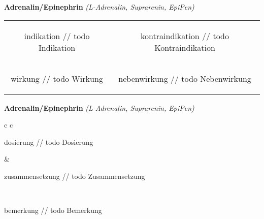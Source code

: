 \documentclass[12pt]{beamer}
\begin{document}
\begin{frame}{
    \textbf{Adrenalin/Epinephrin}
    \textit{(L-Adrenalin, Suprarenin, EpiPen)}
}
    \begin{tabular}{c c}
        \begin{beamercolorbox}[wd=\boxwidth\textwidth,ht=\boxheight\textheight,sep=1em]{indikation}
        // todo Indikation
        \end{beamercolorbox} & 
        \begin{beamercolorbox}[wd=\boxwidth\textwidth,ht=\boxheight\textheight,sep=1em]{kontraindikation}
        // todo Kontraindikation 
        \end{beamercolorbox} \\
        \begin{beamercolorbox}[wd=\boxwidth\textwidth,ht=\boxheight\textheight,sep=1em]{wirkung}
        // todo Wirkung
        \end{beamercolorbox} & 
        \begin{beamercolorbox}[wd=\boxwidth\textwidth,ht=\boxheight\textheight,sep=1em]{nebenwirkung}
        // todo Nebenwirkung
        \end{beamercolorbox} \\
    \end{tabular}
\end{frame}

\begin{frame}{
    \textbf{Adrenalin/Epinephrin}
    \textit{(L-Adrenalin, Suprarenin, EpiPen)}
}
    \begin{tabular}{c c}
        \begin{beamercolorbox}[wd=\boxwidth\textwidth,ht=\boxheight\textheight,sep=1em]{dosierung}
        // todo Dosierung
        \end{beamercolorbox} & 
        \begin{beamercolorbox}[wd=\boxwidth\textwidth,ht=\boxheight\textheight,sep=1em]{zusammensetzung}
        // todo Zusammensetzung
        \end{beamercolorbox} \\
        \begin{beamercolorbox}[wd=\textwidth,ht=\boxheight\textheight,sep=1em]{bemerkung}
        // todo Bemerkung
        \end{beamercolorbox} \\
    \end{tabular}
\end{frame}
\end{document}
